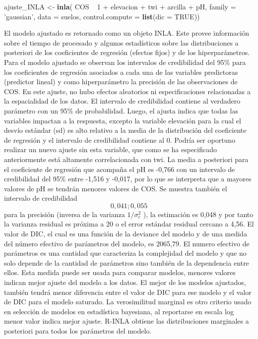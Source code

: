 \documentclass[11pt,b5paper,]{krantz}
\newenvironment{Shaded}{}{}
\newcommand{\DataTypeTok}[1]{\textcolor[rgb]{0.56,0.13,0.00}{#1}}
\newcommand{\DecValTok}[1]{\textcolor[rgb]{0.25,0.63,0.44}{#1}}
\newcommand{\KeywordTok}[1]{\textcolor[rgb]{0.00,0.44,0.13}{\textbf{#1}}}
\newcommand{\NormalTok}[1]{#1}
\newcommand{\OperatorTok}[1]{\textcolor[rgb]{0.40,0.40,0.40}{#1}}
\newcommand{\OtherTok}[1]{\textcolor[rgb]{0.00,0.44,0.13}{#1}}
\newcommand{\StringTok}[1]{\textcolor[rgb]{0.25,0.44,0.63}{#1}}
\begin{document}
\begin{Shaded}
\begin{Highlighting}[]
\NormalTok{ajuste_INLA <-}\StringTok{ }\KeywordTok{inla}\NormalTok{(}
\NormalTok{  COS }\OperatorTok{~}\StringTok{ }\DecValTok{1} \OperatorTok{+}\StringTok{ }\NormalTok{elevacion }\OperatorTok{+}\StringTok{ }\NormalTok{twi }\OperatorTok{+}\StringTok{ }\NormalTok{arcilla }\OperatorTok{+}\StringTok{ }\NormalTok{pH,}
  \DataTypeTok{family =} \StringTok{'gaussian'}\NormalTok{,}
  \DataTypeTok{data =}\NormalTok{ suelos,}
  \DataTypeTok{control.compute =} \KeywordTok{list}\NormalTok{(}\DataTypeTok{dic =} \OtherTok{TRUE}\NormalTok{))}
\end{Highlighting}
\end{Shaded}

El modelo ajustado es retornado como un objeto INLA. Este provee información sobre el tiempo de procesado y algunos estadísticos sobre las distribuciones a posteriori de los coeficientes de regresión (efectos fijos) y de los hiperparámetros. Para el modelo ajustado se observan los intervalos de credibilidad del 95\% para los coeficientes de regresión asociados a cada una de las variables predictoras (predictor lineal) y como hiperparámetro la precisión de las observaciones de COS. En este ajuste, no hubo efectos aleatorios ni especificaciones relacionadas a la espacialidad de los datos.
El intervalo de credibilidad contiene al verdadero parámetro con un 95\% de probabilidad. Luego, el ajusta indica que todas las variables impactan a la respuesta, excepto la variable elevación para la cual el desvío estándar (sd) es alto relativo a la media de la distribución del coeficiente de regresión y el intervalo de credibilidad contiene al 0. Podría ser oportuno realizar un nuevo ajuste sin esta variable, que como se ha especificado anteriormente está altamente correlacionada con twi. La media a posteriori para el coeficiente de regresión que acompaña el pH es -0,766 con un intervalo de credibilidad del 95\% entre -1,516 y -0,017, por lo que se interpreta que a mayores valores de pH se tendrán menores valores de COS. Se muestra también el intervalo de credibilidad \[0,041; 0,055\] para la precisión (inversa de la varianza \(1/\sigma_e^2\) ), la estimación es 0,048 y por tanto la varianza residual es próxima a 20 o el error estándar residual cercano a 4,56. El valor de DIC, el cual es una función de la deviance del modelo y de una medida del número efectivo de parámetros del modelo, es 2065,79. El numero efectivo de parámetros es una cantidad que caracteriza la complejidad del modelo y que no solo depende de la cantidad de parámetros sino también de la dependencia entre ellos. Esta medida puede ser usada para comparar modelos, menores valores indican mejor ajuste del modelo a los datos. El mejor de los modelos ajustados, también tendrá menor diferencia entre el valor de DIC para ese modelo y el valor de DIC para el modelo saturado. La verosimilitud marginal es otro criterio usado en selección de modelos en estadística bayesiana, al reportarse en escala log menor valor indica mejor ajuste. R-INLA obtiene las distribuciones marginales a posteriori para todos los parámetros del modelo.
\end{document}
